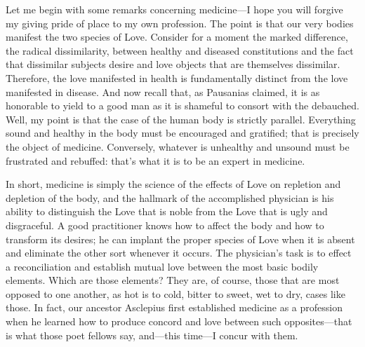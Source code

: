 Let me begin with some remarks concerning medicine---I hope you will
forgive my giving pride of place to my own profession. The point is that
our very bodies manifest the two species of Love. Consider for a moment
the marked difference, the radical dissimilarity, between healthy and
diseased constitutions and the fact that dissimilar subjects desire and
love objects that are themselves dissimilar. Therefore, the love
manifested in health is fundamentally distinct from the love manifested
in disease. And  now recall that, as Pausanias claimed, it is as
honorable to yield to a good man as it is shameful to consort with the
debauched. Well, my point is that the case of the human body is strictly
parallel. Everything sound and healthy in the body must be encouraged
and gratified; that is precisely the object of medicine. Conversely,
whatever is unhealthy and unsound must be frustrated and rebuffed:
that’s what it is to be an expert in medicine.

 In short, medicine is simply the science of the effects of Love
on repletion and depletion of the body, and the hallmark of the
accomplished physician is his ability to distinguish the Love that is
noble from the Love that is ugly and disgraceful. A good practitioner
knows how to affect the body and how to transform its desires; he can
implant the proper species of Love when it is absent and eliminate the
other sort whenever it occurs. The physician’s task is to effect a
reconciliation and establish mutual love between the most basic bodily
elements. Which are those elements? They are, of course, those that are
most opposed to one another, as hot is to  cold, bitter to sweet,
wet to dry, cases like those. In fact, our ancestor Asclepius first
established medicine as a profession when he learned how to produce
concord and love between such opposites---that is what those poet
fellows say, and---this time---I concur with them.


